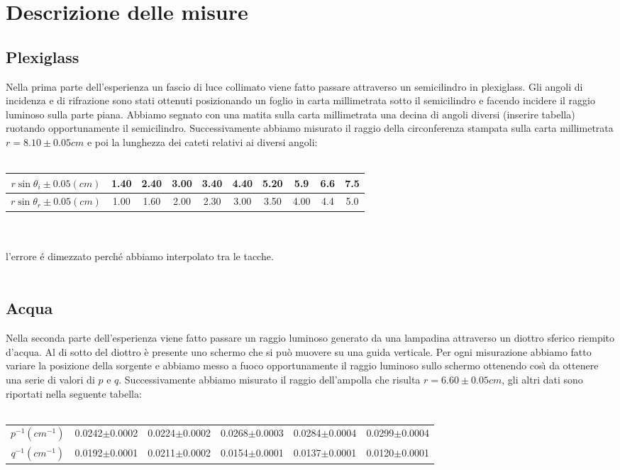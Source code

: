 \documentclass{article}
\begin{document}
	\section{Descrizione delle misure}
		\subsection{Plexiglass}
			Nella prima parte dell'esperienza un fascio di luce collimato viene fatto passare attraverso un semicilindro in plexiglass. Gli angoli di incidenza e di rifrazione sono stati ottenuti posizionando un foglio in carta millimetrata sotto il semicilindro e facendo incidere il raggio luminoso sulla parte piana. Abbiamo segnato con una matita sulla carta millimetrata una decina di angoli diversi (inserire tabella) ruotando opportunamente il semicilindro. Successivamente abbiamo misurato il raggio della circonferenza stampata sulla carta millimetrata $r = 8.10 \pm 0.05 cm$ e poi la lunghezza dei cateti relativi ai diversi angoli:\\\\
			\begin{tabular}{c|c|c|c|c|c|c|c|c|c}
				$r\sin\theta_i \pm0.05(cm)$& 1.40& 2.40& 3.00& 3.40& 4.40& 5.20& 5.9& 6.6& 7.5  \\ 
				\hline 
				$r\sin\theta_r \pm 0.05(cm)$& 1.00& 1.60& 2.00& 2.30& 3.00& 3.50& 4.00& 4.4& 5.0 \\ 
			\end{tabular}\\\\
			l'errore \'{e} dimezzato perch\'{e} abbiamo interpolato tra le tacche.\\\\
		
		\subsection{Acqua}
			Nella seconda parte dell'esperienza viene fatto passare un raggio luminoso generato da una lampadina attraverso un diottro sferico riempito d'acqua. Al di sotto del diottro \`{e} presente uno schermo che si pu\`{o} muovere su una guida verticale. Per ogni misurazione abbiamo fatto variare la posizione della sorgente e abbiamo messo a fuoco opportunamente il raggio luminoso sullo schermo ottenendo cos\`{\i} da ottenere una serie di valori di $p$ e $q$. Successivamente abbiamo misurato il raggio dell'ampolla che risulta $r = 6.60 \pm 0.05 cm$, gli altri dati sono riportati nella seguente tabella:\\\\
			\begin{adjustbox}{width=\textwidth}
			\begin{tabular}{c|c|c|c|c|c}
				\centering
				$\textit{p}^{-1}(cm^{-1})$& 0.0242$\pm$0.0002& 0.0224$\pm$0.0002& 0.0268$\pm$0.0003& 0.0284$\pm$0.0004& 0.0299$\pm$0.0004\\ 
				$\textit{q}^{-1}(cm^{-1})$& 0.0192$\pm$0.0001& 0.0211$\pm$0.0002& 0.0154$\pm$0.0001& 0.0137$\pm$0.0001& 0.0120$\pm$0.0001\\
			\end{tabular}
			\end{adjustbox}\\
		
\end{document}
